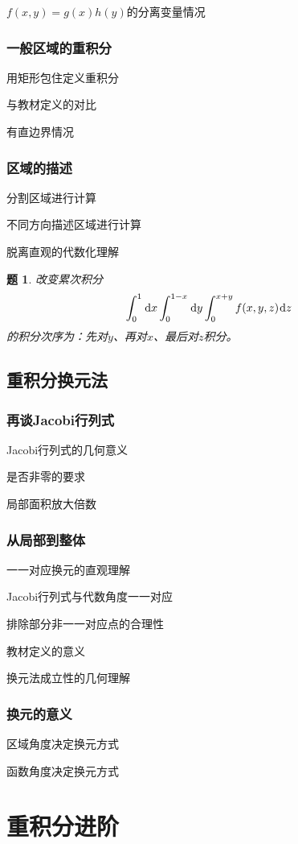 \documentclass[a4paper,UTF8,fontset=windows,AutoFakeBold]{ctexart}
\newcommand*{\dr}{\hspace{0.07em}\mathrm{d}}
\theoremstyle{ex}
\newtheorem{exercise}{题}
\begin{document}
$f(x,y)=g(x)h(y)$的分离变量情况

\subsubsection{一般区域的重积分}
用矩形包住定义重积分

与教材定义的对比

有直边界情况

\subsubsection{区域的描述}
分割区域进行计算

不同方向描述区域进行计算

脱离直观的代数化理解

\begin{framed}
\begin{exercise}
    改变累次积分
    $$\int_0^1\dr x\int_0^{1-x}\dr y\int_0^{x+y}f(x,y,z)\dr z$$
    的积分次序为：先对$y$、再对$x$、最后对$z$积分。
\end{exercise}
\end{framed}

\subsection{重积分换元法}
\subsubsection{再谈Jacobi行列式}
Jacobi行列式的几何意义

是否非零的要求

局部面积放大倍数

\subsubsection{从局部到整体}
一一对应换元的直观理解

Jacobi行列式与代数角度一一对应

排除部分非一一对应点的合理性

教材定义的意义

换元法成立性的几何理解

\subsubsection{换元的意义}
区域角度决定换元方式

函数角度决定换元方式

\newpage
\section{重积分进阶}
\end{document}
